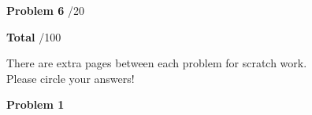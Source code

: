 \documentclass[12pt]{amsbook}
\begin{document}
\textbf{Problem 6} \; \underline{\hspace{1cm}}/20

\vspace{.5cm}

\textbf{Total} \;\hspace{1.1cm} \underline{\hspace{1.25cm}}/100

\vspace*{4cm}


\begin{center}\large{There are extra pages between each problem for scratch work.\\

Please circle your answers!}\end{center}










\newpage

\textbf{Problem 1}

\vspace{.25cm}
\end{document}
